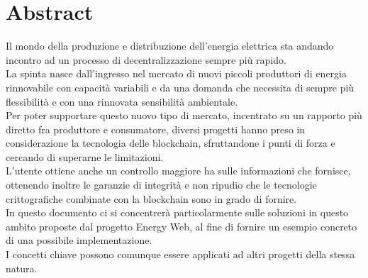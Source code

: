 \chapter*{Abstract}

Il mondo della produzione e distribuzione dell'energia elettrica sta andando incontro ad un processo di decentralizzazione sempre più rapido. \\
La spinta nasce dall'ingresso nel mercato di nuovi piccoli produttori di energia rinnovabile con capacità variabili e
da una domanda che necessita di sempre più flessibilità e con una rinnovata sensibilità ambientale. \\
Per poter supportare questo nuovo tipo di mercato, incentrato su un rapporto più diretto fra produttore e consumatore,
diversi progetti hanno preso in considerazione la tecnologia delle blockchain, sfruttandone i punti di forza e cercando di superarne le limitazioni. \\
L'utente ottiene anche un controllo maggiore ha sulle informazioni che fornisce, ottenendo inoltre le garanzie di integrità e non ripudio che le tecnologie
crittografiche combinate con la blockchain sono in grado di fornire. \\
In questo documento ci si concentrerà particolarmente sulle soluzioni in questo ambito proposte dal progetto Energy Web,
al fine di fornire un esempio concreto di una possibile implementazione. \\
I concetti chiave possono comunque essere applicati ad altri progetti della stessa natura.
